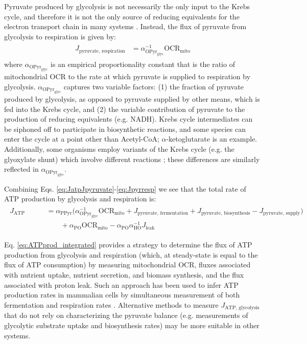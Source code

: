 \documentclass{compactarticle}
\begin{document}
Pyruvate produced by glycolysis is not necessarily the only input to the Krebs cycle, and therefore it is not the only source of reducing equivalents for the electron transport chain in many systems \cite{martinez2020mitochondrial,filipp2012glutamine}. Instead, the flux of pyruvate from glycolysis to respiration is given by:
\begin{align}
    \begin{split}
        J_\text{pyruvate, respiration} &= \alpha_{\text{O}\text{Pyr}_{\text{glyc}}}^{-1} \text{OCR}_\text{mito}
    \end{split}
    \label{eq:Jpyrresp}
\end{align}
\noindent where $ \alpha_{\text{O}\text{Pyr}_{\text{glyc}}} $ is an empirical proportionality constant that is the ratio of mitochondrial OCR to the rate at which pyruvate is supplied to respiration by glycolysis. $ \alpha_{\text{O}\text{Pyr}_{\text{glyc}}} $ captures two variable factors: (1) the fraction of pyruvate produced by glycolysis, as opposed to pyruvate
supplied by other means, which is fed into the Krebs cycle, and (2) the variable contribution of pyruvate to the production of reducing equivalents (e.g. NADH). Krebs cycle intermediates can be siphoned off to participate in biosynthetic reactions, and some species can enter the cycle at a point other than Acetyl-CoA; $\alpha$-ketoglutarate is an example. Additionally, some organisms employ variants of the Krebs cycle (e.g. the glyoxylate shunt) which involve different reactions \cite{fraenkel2011yeast}; these differences are similarly reflected in $ \alpha_{\text{O}\text{Pyr}_{\text{glyc}}} $.

Combining Eqs. \ref{eq:JatpJpyruvate}-\ref{eq:Jpyrresp} we see that the total rate of ATP production by glycolysis and respiration is:
\begin{align}
    \begin{split}
        J_\text{ATP production} &= \alpha_\text{PPyr} \bigg( \alpha_{\text{O}\text{Pyr}_{\text{glyc}}}^{-1} \text{OCR}_\text{mito} + J_\text{pyruvate, fermentation}+ J_\text{pyruvate, biosynthesis} - J_\text{pyruvate, supply} \bigg) \\
        &\qquad+ \alpha_\text{PO} \text{OCR}_\text{mito} - \alpha_\text{PO} \alpha_\text{HO}^{-1} J_\text{leak}
    \end{split}
    \label{eq:ATPprod_integrated}
\end{align}

\noindent Eq. \ref{eq:ATPprod_integrated} provides a strategy to determine the flux of ATP production from glycolysis and respiration (which, at steady-state is equal to the flux of ATP consumption) by measuring mitochondrial OCR, fluxes associated with nutrient uptake, nutrient secretion, and biomass synthesis, and the flux associated with proton leak. Such an approach has been used to infer ATP production rates in mammalian cells by simultaneous measurement of both fermentation and respiration rates \cite{mookerjee2017quantifying,ferrick2008}. Alternative methods to measure $ J_\text{ATP, glycolysis} $ that do not rely on characterizing the pyruvate balance (e.g. measurements of glycolytic substrate uptake and biosynthesis rates) may be more suitable in other systems.
\end{document}
